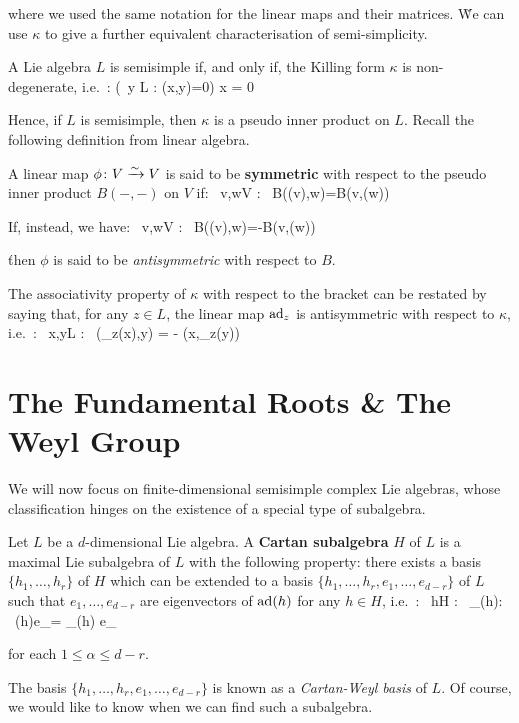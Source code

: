 where we used the same notation for the linear maps and their matrices. \v

We can use $\kappa$ to give a further equivalent characterisation of semi-simplicity.

A Lie algebra $L$ is semisimple if, and only if, the Killing form $\kappa$ is non-degenerate, i.e.\ :
\bse
(\forall \, y \in L : \kappa(x,y)=0) \Rightarrow x = 0
\ese
\et

Hence, if $L$ is semisimple, then $\kappa$ is a pseudo inner product on $L$. Recall the following definition from
linear algebra.

A linear map $\phi\colon V\xrightarrow{\sim}V$ is said to be \textbf{symmetric} with respect to the pseudo inner product
$B(-,-)$ on $V$ if:
\bse
\forall \, v,w\in V : \ B(\phi(v),w)=B(v,\phi(w))
\ese

If, instead, we have:
\bse
\forall \, v,w\in V : \ B(\phi(v),w)=-B(v,\phi(w))
\ese

\v

then $\phi$ is said to be \emph{antisymmetric} with respect to $B$.
\ed

The associativity property of $\kappa$ with respect to the bracket can be restated by saying that, for any $z\in L$,
the linear map $\operatorname{ad}_z$ is antisymmetric with respect to $\kappa$, i.e.\ :
\bse
\forall \, x,y\in L : \ \kappa(\ad_z(x),y) = - \kappa(x,\ad_z(y))
\ese

\section{The Fundamental Roots \& The Weyl Group}

We will now focus on finite-dimensional semisimple complex Lie algebras, whose classification hinges on the
existence of a special type of subalgebra.

Let $L$ be a $d$-dimensional Lie algebra. A \textbf{Cartan subalgebra} $H$ of $L$ is a maximal Lie subalgebra of $L$
with the following property: there exists a basis $\{h_1,\ldots,h_r\}$ of $H$ which can be extended to a basis
$\{h_1,\ldots,h_r,e_1,\ldots,e_{d-r}\}$ of $L$ such that $e_1,\ldots,e_{d-r}$ are eigenvectors of $\operatorname{ad}(h)$ for any
$h\in H$, i.e.\ :
\bse
\forall \, h\in H : \exists \, \lambda_\alpha(h)\in \C : \ \ad(h)e_\alpha = \lambda_\alpha(h) e_\alpha
\ese

for each $1\leq\alpha\leq d-r$.
\ed

The basis $\{h_1,\ldots,h_r,e_1,\ldots,e_{d-r}\}$ is known as a \emph{Cartan-Weyl basis} of $L$. Of course, we would
like to know when we can find such a subalgebra.


